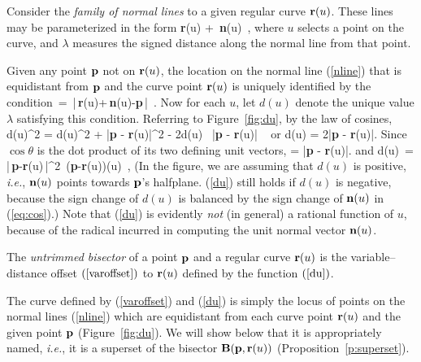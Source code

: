 Consider the {\it family of normal lines\/} to a given regular curve
${\bf r}(u)$. These lines may be parameterized in the form
\be \label{nline}
{\bf r}(u) + \lambda\,{\bf n}(u) \,,
\ee
where $u$ selects a point on the curve, and $\lambda$ measures the
signed distance along the normal line from that point.

Given any point ${\bf p}$ not on ${\bf r}(u)$, the location on the
normal line (\ref{nline}) that is equidistant from ${\bf p}$ and the
curve point ${\bf r}(u)$ is uniquely identified by the condition
\be
\lambda \,=\, |\,{\bf r}(u)+\lambda\,{\bf n}(u)-{\bf p}\,| \,.
\ee
Now for each $u$, let $d(u)$ denote the unique value $\lambda$
satisfying this condition. 
Referring to Figure~\ref{fig:du},
by the law of cosines,
\be
	d(u)^{2} = d(u)^{2} + |{\bf p} - {\bf r}(u)|^{2} - 
		   2d(u) \ |{\bf p} - {\bf r}(u)| \ \cos \theta
\ee
or 
\be
	d(u) = 
		    {2|{\bf p} - {\bf r}(u)|\cos \theta}.
\ee
Since $\cos \theta$ is the dot product of its two defining unit vectors,
\be
\label{eq:cos}
	\cos \theta = 
			   {|{\bf p} - {\bf r}(u)|}.
\ee
and
\be \label{du}
d(u) \,=\, {|\,{\bf p}-{\bf r}(u)\,|^2 \,({\bf p}-{\bf r}(u))(u)} \,,
\ee
(In the figure, we are assuming that $d(u)$ is positive, {\em i.e.}, 
${\bf n}(u)$ points towards
${\bf p}$'s halfplane.
(\ref{du}) still holds if $d(u)$ is negative,
because the sign change of $d(u)$ is balanced by the sign
change of ${\bf n}(u)$ in (\ref{eq:cos}).)
Note that (\ref{du}) is evidently 
{\it not\/} (in general) a rational function of
$u$, because of the radical incurred in computing the unit normal
vector ${\bf n}(u)$.

\begin{dfn}
The {\it untrimmed bisector\/} of a point ${\bf p}$ and a regular
curve ${\bf r}(u)$ is the variable--distance offset $(\ref{varoffset})$
to ${\bf r}(u)$ defined by the function $(\ref{du})$.
\end{dfn}

The curve defined by (\ref{varoffset}) and (\ref{du}) is simply
the locus of points on the normal lines (\ref{nline}) which are
equidistant from each curve point ${\bf r}(u)$ and the given point
${\bf p}$ (Figure~\ref{fig:du}).
We will show below that it is appropriately named, {\em i.e.}, it
is a superset of the bisector ${\bf B}({\bf p},{\bf r}(u))$ 
(Proposition~\ref{p:superset}).

